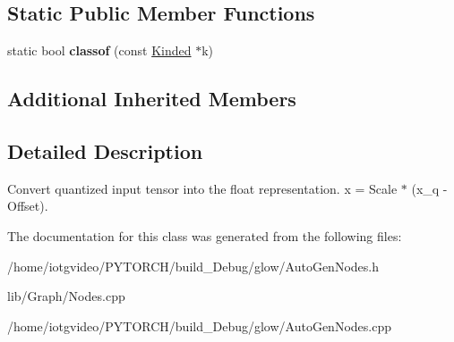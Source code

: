 \subsection*{Static Public Member Functions}
\begin{DoxyCompactItemize}
\item 
\mbox{\label{classglow_1_1_dequantize_node_a0d7e31f76f349d890d847652a68a23dd}} 
static bool {\bfseries classof} (const \hyperlink{classglow_1_1_kinded}{Kinded} $\ast$k)
\end{DoxyCompactItemize}
\subsection*{Additional Inherited Members}


\subsection{Detailed Description}
Convert quantized input tensor into the float representation. x = Scale $\ast$ (x\+\_\+q -\/ Offset). 

The documentation for this class was generated from the following files\+:\begin{DoxyCompactItemize}
\item 
/home/iotgvideo/\+P\+Y\+T\+O\+R\+C\+H/build\+\_\+\+Debug/glow/Auto\+Gen\+Nodes.\+h\item 
lib/\+Graph/Nodes.\+cpp\item 
/home/iotgvideo/\+P\+Y\+T\+O\+R\+C\+H/build\+\_\+\+Debug/glow/Auto\+Gen\+Nodes.\+cpp\end{DoxyCompactItemize}
